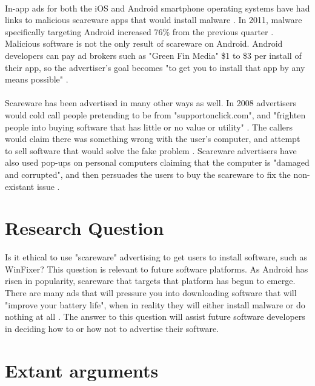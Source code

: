 \documentclass[11pt]{article}
\begin{document}
\begin{multicols}{2}
\vspace{10pt} \\
In-app ads for both the iOS and Android smartphone operating systems have had links to malicious scareware apps that would install malware \cite{pcworldandroid}. In 2011, malware specifically targeting Android increased 76\% from the previous quarter \cite{pcworldandroid}. Malicious software is not the only result of scareware on Android. Android developers can pay ad brokers such as "Green Fin Media" \$1 to \$3 per install of their app, so the advertiser's goal becomes "to get you to install that app by any means possible" \cite{pcworldandroid}. \\
\vspace{10pt} \\
Scareware has been advertised in many other ways as well. In 2008 advertisers would cold call people pretending to be from "supportonclick.com", and "frighten people into buying software that has little or no value or utility" \cite{registercoldtactics}. The callers would claim there was something wrong with the user's computer, and attempt to sell software that would solve the fake problem \cite{registercoldtactics}. Scareware advertisers have also used pop-ups on personal computers claiming that the computer is "damaged and corrupted", and then persuades the users to buy the scareware to fix the non-existant issue \cite{registercoldtactics}.

\section{Research Question}
Is it ethical to use "scareware" advertising to get users to install software, such as WinFixer?\cite{pcworld8.2million}\cite{pcworldandroid}
This question is relevant to future software platforms. As Android has risen in popularity, scareware that targets that platform has begun to emerge\cite{pcworldandroid}. There are many ads that will pressure you into downloading software that will "improve your battery life", when in reality they will either install malware or do nothing at all \cite{pcworldandroid}. The answer to this question will assist future software developers in deciding how to or how not to advertise their software.

\section{Extant arguments}

\end{multicols}
\end{document}
